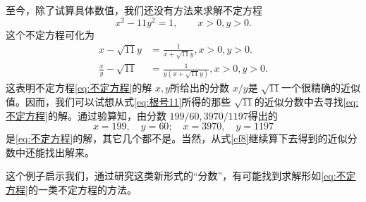 \begin{example}
	至今，除了试算具体数值，我们还没有方法来求解不定方程
	\begin{equation}
		x^2 - 11y^2 = 1, \qquad x > 0, y > 0. \label{eq:不定方程}
	\end{equation}
	这个不定方程可化为
	\begin{align}
		x - \sqrt{11}y          & = \frac{1}{x + \sqrt{11}y}, x > 0, y > 0. \nonumber \\
		\frac{x}{y} - \sqrt{11} & = \frac{1}{y(x + \sqrt{11}y)}, x > 0, y > 0.
	\end{align}
	这表明不定方程\eqref{eq:不定方程}的解 \( x, y \)所给出的分数 \( x/y \)是 \( \sqrt{11}
	\)一个很精确的近似值。因而，我们可以试想从式\eqref{eq:根号11}所得的那些 \( \sqrt{11}
	\)的近似分数中去寻找\eqref{eq:不定方程}的解。通过验算知，由分数 \( 199/60, 3970/1197 \)得出的
	\begin{equation}
		x=199,\quad y=60; \quad x=3970, \quad y=1197
	\end{equation}
	是\eqref{eq:不定方程}的解，其它几个都不是。当然，从式\eqref{cf8}继续算下去得到的近似分数中还能找出解来。

	这个例子启示我们，通过研究这类新形式的\enquote{分数}，有可能找到求解形如\eqref{eq:不定方程}的一类不定方程的方法。
\end{example}
